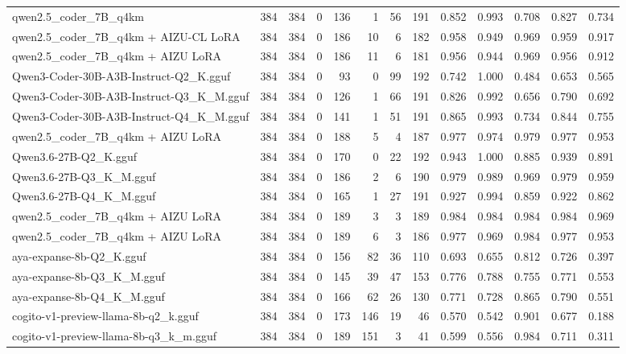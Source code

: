 \begin{table}[htbp]
{\begin{tabular}{lrrrrrrrrrrrr}
    qwen2.5\_coder\_7B\_q4km & 384 & 384 & 0 & 136 & 1 & 56 & 191 & 0.852 & 0.993 & 0.708 & 0.827 & 0.734 \\
    qwen2.5\_coder\_7B\_q4km + AIZU-CL LoRA & 384 & 384 & 0 & 186 & 10 & 6 & 182 & 0.958 & 0.949 & 0.969 & 0.959 & 0.917 \\
    qwen2.5\_coder\_7B\_q4km + AIZU LoRA & 384 & 384 & 0 & 186 & 11 & 6 & 181 & 0.956 & 0.944 & 0.969 & 0.956 & 0.912 \\
    Qwen3-Coder-30B-A3B-Instruct-Q2\_K.gguf & 384 & 384 & 0 & 93 & 0 & 99 & 192 & 0.742 & 1.000 & 0.484 & 0.653 & 0.565 \\
    Qwen3-Coder-30B-A3B-Instruct-Q3\_K\_M.gguf & 384 & 384 & 0 & 126 & 1 & 66 & 191 & 0.826 & 0.992 & 0.656 & 0.790 & 0.692 \\
    Qwen3-Coder-30B-A3B-Instruct-Q4\_K\_M.gguf & 384 & 384 & 0 & 141 & 1 & 51 & 191 & 0.865 & 0.993 & 0.734 & 0.844 & 0.755 \\
    qwen2.5\_coder\_7B\_q4km + AIZU LoRA & 384 & 384 & 0 & 188 & 5 & 4 & 187 & 0.977 & 0.974 & 0.979 & 0.977 & \cellcolor{green!20}0.953 \\
    Qwen3.6-27B-Q2\_K.gguf & 384 & 384 & 0 & 170 & 0 & 22 & 192 & 0.943 & 1.000 & 0.885 & 0.939 & 0.891 \\
    Qwen3.6-27B-Q3\_K\_M.gguf & 384 & 384 & 0 & 186 & 2 & 6 & 190 & 0.979 & 0.989 & 0.969 & 0.979 & \cellcolor{green!40}0.959 \\
    Qwen3.6-27B-Q4\_K\_M.gguf & 384 & 384 & 0 & 165 & 1 & 27 & 191 & 0.927 & 0.994 & 0.859 & 0.922 & 0.862 \\
    qwen2.5\_coder\_7B\_q4km + AIZU LoRA & 384 & 384 & 0 & 189 & 3 & 3 & 189 & 0.984 & 0.984 & 0.984 & 0.984 & \cellcolor{green!50}0.969 \\
    qwen2.5\_coder\_7B\_q4km + AIZU LoRA & 384 & 384 & 0 & 189 & 6 & 3 & 186 & 0.977 & 0.969 & 0.984 & 0.977 & \cellcolor{green!30}0.953 \\
    aya-expanse-8b-Q2\_K.gguf & 384 & 384 & 0 & 156 & 82 & 36 & 110 & 0.693 & 0.655 & 0.812 & 0.726 & 0.397 \\
    aya-expanse-8b-Q3\_K\_M.gguf & 384 & 384 & 0 & 145 & 39 & 47 & 153 & 0.776 & 0.788 & 0.755 & 0.771 & 0.553 \\
    aya-expanse-8b-Q4\_K\_M.gguf & 384 & 384 & 0 & 166 & 62 & 26 & 130 & 0.771 & 0.728 & 0.865 & 0.790 & 0.551 \\
    cogito-v1-preview-llama-8b-q2\_k.gguf & 384 & 384 & 0 & 173 & 146 & 19 & 46 & 0.570 & 0.542 & 0.901 & 0.677 & 0.188 \\
    cogito-v1-preview-llama-8b-q3\_k\_m.gguf & 384 & 384 & 0 & 189 & 151 & 3 & 41 & 0.599 & 0.556 & 0.984 & 0.711 & 0.311 \\

\end{tabular}}
\end{table}
